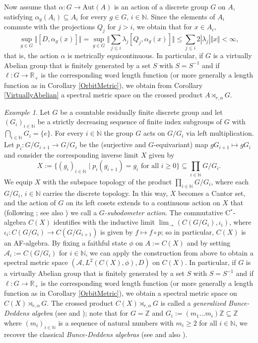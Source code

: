 \documentclass[a4paper,11pt,reqno]{amsart}
\numberwithin{equation}{section}
\numberwithin{equation}{section}
\theoremstyle{definition}
\theoremstyle{remark}
\newtheorem{example}[theorem]{Example}
\theoremstyle{remark}
\begin{document}
Now assume that $\alpha:G\rightarrow\text{Aut}(A)$ is an action of
a discrete group $G$ on $A$, satisfying $\alpha_{g}(A_{i})\subseteq A_{i}$
for every $g\in G$, $i\in\mathbb{N}$. Since the elements of $A_{i}$
commute with the projections $Q_{j}$ for $j>i$, we obtain that for
$x\in A_{i}$,
\[
\sup_{g\in G}\Vert[D,\alpha_{g}(x)]\Vert=\sup_{g\in G}\Vert\sum_{j\leq i}\lambda_{j}[Q_{j},\alpha_{g}(x)]\Vert\leq\sum_{j\leq i}2\left|\lambda_{j}\right|\Vert x\Vert < \infty,
\]
that is, the action $\alpha$ is metrically equicontinuous. In particular,
if $G$ is a virtually Abelian group that is finitely generated by
a set $S$ with $S=S^{-1}$ and if $\ell:G\rightarrow\mathbb{R}_{+}$
is the corresponding word length function (or more generally a length
function as in Corollary \ref{OrbitMetric}), we obtain from Corollary
\ref{VirtuallyAbelian} a spectral metric space on the
crossed product $A\rtimes_{r,\alpha}G$.

\begin{example} Let $G$ be a countable residually finite discrete
group and let $(G_{i})_{i\in\mathbb{N}}$ be a strictly decreasing
sequence of finite index subgroups of $G$ with $\bigcap_{i\in\mathbb{N}}G_{i}=\{e\}$.
For every $i\in\mathbb{N}$ the group $G$ acts on $G/G_{i}$ via
left multiplication. Let $p_{i}:G/G_{i+1}\rightarrow G/G_{i}$ be
the (surjective and $G$-equivariant) map $gG_{i+1}\mapsto gG_{i}$
and consider the corresponding inverse limit $X$ given by 
\[
X:=\{(g_{i})_{i\in\mathbb{N}}\mid p_{i}(g_{i+1})=g_{i}\text{ for all }i\geq0\}\subseteq\prod_{i\in\mathbb{N}}G/G_{i}.
\]
We equip $X$ with the subspace topology of the product $\prod_{i\in\mathbb{N}}G/G_{i}$,
where each $G/G_{i}$, $i\in\mathbb{N}$ carries the discrete topology.
In this way, $X$ becomes a Cantor set, and the action of $G$ on its
left cosets extends to a continuous action on $X$ that (following
\cite[Definition 2]{CP08}; see also \cite{Krieger10}) we call
a \emph{$G$-subodometer action}. The commutative C$^{\ast}$-algebra
$C(X)$ identifies with the inductive limit $\lim_{\rightarrow}(C(G/G_{i}),\iota_{i})$,
where $\iota_{i}:C(G/G_{i})\rightarrow C(G/G_{i+1})$ is given by
$f\mapsto f\circ p$; so in particular, $C(X)$ is an AF-algebra. By
fixing a faithful state $\phi$ on $A:=C(X)$ and by setting $\mathcal{A}_{i}:=C(G/G_{i})$
for $i\in\mathbb{N}$, we can apply the construction from above to
obtain a spectral metric space $(\mathcal{A},L^{2}(C(X),\phi),D)$
on $C(X)$. In particular,
if $G$ is a virtually Abelian group that is finitely generated by
a set $S$ with $S=S^{-1}$ and if $\ell:G\rightarrow\mathbb{R}_{+}$
is the corresponding word length function (or more generally a length
function as in Corollary \ref{OrbitMetric}), we obtain a spectral metric space on $C(X)\rtimes_{r,\alpha}G$. The crossed product $C(X)\rtimes_{r,\alpha}G$
is called a \emph{generalized Bunce-Deddens algebra} (see \cite{Orfanos10}
and \cite{Carrion11}); note that for $G=\mathbb{Z}$ and $G_{i}:=(m_{1}...m_{i})\mathbb{Z}\subseteq\mathbb{Z}$
where $(m_{i})_{i\in\mathbb{N}}$ is a sequence of natural numbers
with $m_{i}\geq2$ for all $i\in\mathbb{N}$, we recover the classical
\emph{Bunce-Deddens algebras} (see \cite{BD75} and also \cite[Chapter V.3]{Davidson96}).
\end{example}
\end{document}
